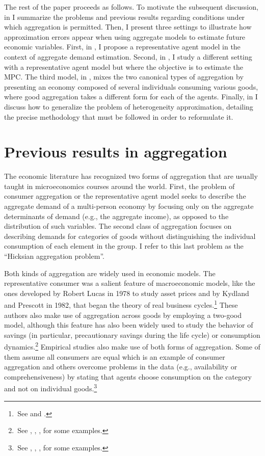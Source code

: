 \documentclass[english, a4paper, 12pt]{article}
\begin{document}
The rest of the paper proceeds as follows. To motivate the subsequent discussion, in  I summarize the problems and previous results regarding conditions under which aggregation is permitted. Then, I present three settings to illustrate how approximation errors appear when using aggregate models to estimate future economic variables. First, in , I propose a representative agent model in the context of aggregate demand estimation. Second, in , I study a different setting with a representative agent model but where the objective is to estimate the MPC. The third model, in , mixes the two canonical types of aggregation by presenting an economy composed of several individuals consuming various goods, where good aggregation takes a different form for each of the agents. Finally, in  I discuss how to generalize the problem of heterogeneity approximation, detailing the precise methodology that must be followed in order to reformulate it.

\section{Previous results in aggregation} \label{sec:PrevResults}
The economic literature has recognized two forms of aggregation that are usually taught in microeconomics courses around the world. First, the problem of consumer aggregation or the representative agent model seeks to describe the aggregate demand of a multi-person economy by focusing only on the aggregate determinants of demand (e.g., the aggregate income), as opposed to the distribution of such variables. The second class of aggregation focuses on describing demands for categories of goods without distinguishing the individual consumption of each element in the group. I refer to this last problem as the ``Hicksian aggregation problem''.

Both kinds of aggregation are widely used in economic models. The representative consumer was a salient feature of macroeconomic models, like the ones developed by Robert Lucas in 1978 to study asset prices and by Kydland and Prescott in 1982, that began the theory of real business cycles.\footnote{\,See \cite{Lucas78} and \cite{KyPr82}.} These authors also make use of aggregation across goods by employing a two-good model, although this feature has also been widely used to study the behavior of savings (in particular, precautionary savings during the life cycle) or consumption dynamics.\footnote{\,See \cite{Carroll92}, \cite{GourinchasParker02}, \cite{GulPesendorfer04}, \cite{ParkerPreston05} for some examples.} Empirical studies also make use of both forms of aggregation. Some of them assume all consumers are equal which is an example of consumer aggregation and others overcome problems in the data (e.g., availability or comprehensiveness) by stating that agents choose consumption on the category and not on individual goods.\footnote{\,See \cite{KaplanViolante14}, \cite{BergerVavra15}, \cite{KanPengWang17}, \cite{FagerengGuisoPistaferri17} for some examples.}
\end{document}
